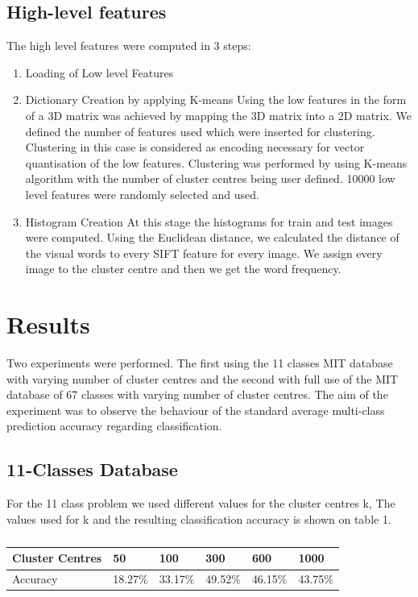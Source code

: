 \documentclass[10pt,twocolumn,letterpaper]{article}
\begin{document}
\subsection{High-level features}
The high level features were computed in 3 steps:
\begin{enumerate}
   \item Loading of Low level Features 
   \item Dictionary Creation by applying K-means \newline
   Using the low features in the form of a 3D matrix was achieved by mapping the 3D matrix into a 2D matrix. We defined the number of features used which were inserted for clustering. Clustering in this case is considered as encoding necessary for vector quantisation of the low features.  Clustering was performed by using K-means algorithm with the number of cluster centres being user defined. 10000 low level features were randomly selected and used.  
     
   \item Histogram Creation \newline
   At this stage the histograms for train and test images were computed. Using the Euclidean distance, we calculated the distance of the visual words to every SIFT feature  for every image. We assign every image to the cluster centre and then we get the word frequency. 
\end{enumerate}

\section{Results}
Two experiments were performed. The first using the 11 classes MIT database with varying number of cluster centres and the second with full use of the MIT database of 67 classes with varying number of cluster centres. The aim of the experiment was to observe the behaviour of  the standard average multi-class prediction accuracy regarding classification. 
\subsection{11-Classes Database}
For the 11 class problem we used different values for the cluster centres k, The values used for k and the resulting classification accuracy is shown on table 1.
\begin{table}[h]
\caption{}
\begin{tabular}{|l|l|l|l|l|l|}
\hline
Cluster Centres & 50 & 100 & 300 & 600 & 1000 \\ \hline
Accuracy & 18.27\% & 33.17\% & 49.52\% & 46.15\% & 43.75\%  \\ \hline
\end{tabular}
\end{table}
\end{document}
